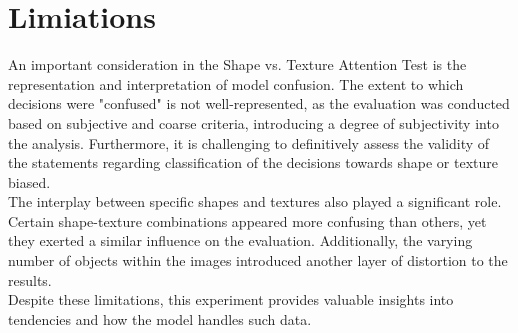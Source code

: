 	
	
	
	
	
	
	\section{Limiations} %
	\label{sec:limitations}
		An important consideration in the Shape vs. Texture Attention Test is the representation and interpretation of model confusion. The extent to which decisions were "confused" is not well-represented, as the evaluation was conducted based on subjective and coarse criteria, introducing a degree of subjectivity into the analysis. Furthermore, it is challenging to definitively assess the validity of the statements regarding classification of the decisions towards shape or texture biased.\\
		The interplay between specific shapes and textures also played a significant role. Certain shape-texture combinations appeared more confusing than others, yet they exerted a similar influence on the evaluation. Additionally, the varying number of objects within the images introduced another layer of distortion to the results. \\
		Despite these limitations, this experiment provides valuable insights into tendencies and how the model handles such data.
	
	
	
	
	\iffalse
	Diskussion - Bias Experiment: In the bias experiment it is difficult to say if a prediction is biased towards texture or shape. All confusing data is only confusing on texture level, so a texture biased model should perform poorly in comparison to a shape biased model. But also a shape biased model will use texture information and the question is how much and how the impact really is. In addition there are other influences, like amount of objects per scene, brightness, reflective texture, novel texture, novel shape and all of these can influence the result. -> my opinion? what does the results look like?
	It seems like that there are learned shape and texture dependent decisions
	\fi
	
	
	








